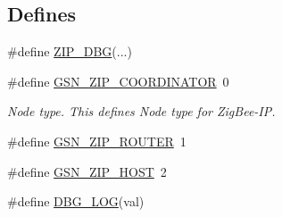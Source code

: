\subsection*{Defines}
\begin{DoxyCompactItemize}
\item 
\#define \hyperlink{a00618_afdac0358e850c8cd6ccb8d1849c15c50}{ZIP\_\-DBG}(...)
\item 
\#define \hyperlink{a00618_a572e48c3222aa4c37312fab04b7f6417}{GSN\_\-ZIP\_\-COORDINATOR}~0
\begin{DoxyCompactList}\small\item\em Node type. This defines Node type for ZigBee-\/IP. \end{DoxyCompactList}\item 
\#define \hyperlink{a00618_ab5f6968db06e6f115ec5c40efa9d0b31}{GSN\_\-ZIP\_\-ROUTER}~1
\item 
\#define \hyperlink{a00618_abfbb595e39cdcb88bba4110c405c6c7a}{GSN\_\-ZIP\_\-HOST}~2
\item 
\#define \hyperlink{a00618_ac7e2addd2b0f0a0294543f89d88d02b2}{DBG\_\-LOG}(val)
\end{DoxyCompactItemize}

